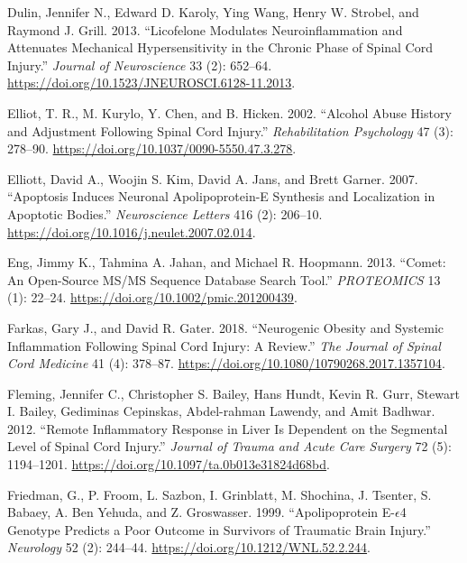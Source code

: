 \documentclass[9pt,lineno]{elife}
\newlength{\cslhangindent}
\newlength{\cslentryspacingunit} %
\newenvironment{CSLReferences}[2] %
 {%
  \setlength{\parindent}{0pt}
  \ifodd #1
  \let\oldpar\par
  \def\par{\hangindent=\cslhangindent\oldpar}
  \fi
  \setlength{\parskip}{#2\cslentryspacingunit}
 }%
 {}
\begin{document}
\begin{CSLReferences}{1}{0}
\leavevmode{}%
Dulin, Jennifer N., Edward D. Karoly, Ying Wang, Henry W. Strobel, and Raymond J. Grill. 2013. {``Licofelone {Modulates Neuroinflammation} and {Attenuates Mechanical Hypersensitivity} in the {Chronic Phase} of {Spinal Cord Injury}.''} \emph{Journal of Neuroscience} 33 (2): 652--64. \url{https://doi.org/10.1523/JNEUROSCI.6128-11.2013}.

\leavevmode{}%
Elliot, T. R., M. Kurylo, Y. Chen, and B. Hicken. 2002. {``Alcohol Abuse History and Adjustment Following Spinal Cord Injury.''} \emph{Rehabilitation Psychology} 47 (3): 278--90. \url{https://doi.org/10.1037/0090-5550.47.3.278}.

\leavevmode{}%
Elliott, David A., Woojin S. Kim, David A. Jans, and Brett Garner. 2007. {``Apoptosis Induces Neuronal Apolipoprotein-{E} Synthesis and Localization in Apoptotic Bodies.''} \emph{Neuroscience Letters} 416 (2): 206--10. \url{https://doi.org/10.1016/j.neulet.2007.02.014}.

\leavevmode{}%
Eng, Jimmy K., Tahmina A. Jahan, and Michael R. Hoopmann. 2013. {``Comet: {An} Open-Source {MS}/{MS} Sequence Database Search Tool.''} \emph{PROTEOMICS} 13 (1): 22--24. \url{https://doi.org/10.1002/pmic.201200439}.

\leavevmode{}%
Farkas, Gary J., and David R. Gater. 2018. {``Neurogenic Obesity and Systemic Inflammation Following Spinal Cord Injury: {A} Review.''} \emph{The Journal of Spinal Cord Medicine} 41 (4): 378--87. \url{https://doi.org/10.1080/10790268.2017.1357104}.

\leavevmode{}%
Fleming, Jennifer C., Christopher S. Bailey, Hans Hundt, Kevin R. Gurr, Stewart I. Bailey, Gediminas Cepinskas, Abdel-rahman Lawendy, and Amit Badhwar. 2012. {``Remote Inflammatory Response in Liver Is Dependent on the Segmental Level of Spinal Cord Injury.''} \emph{Journal of Trauma and Acute Care Surgery} 72 (5): 1194--1201. \url{https://doi.org/10.1097/ta.0b013e31824d68bd}.

\leavevmode{}%
Friedman, G., P. Froom, L. Sazbon, I. Grinblatt, M. Shochina, J. Tsenter, S. Babaey, A. Ben Yehuda, and Z. Groswasser. 1999. {``Apolipoprotein {E-\(\epsilon\)4} Genotype Predicts a Poor Outcome in Survivors of Traumatic Brain Injury.''} \emph{Neurology} 52 (2): 244--44. \url{https://doi.org/10.1212/WNL.52.2.244}.


\end{CSLReferences}
\end{document}

